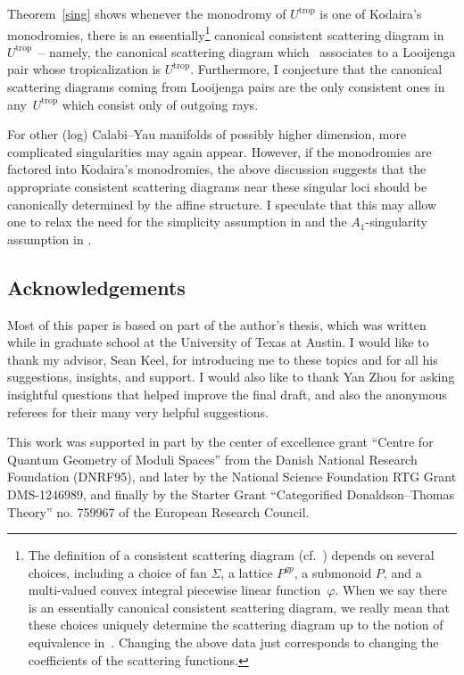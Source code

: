 \documentclass[pdftex]{sigma}
\numberwithin{equation}{section}
\numberwithin{figure}{section}
\numberwithin{table}{section}
\DeclareMathOperator{\trop}{trop}
\theoremstyle{definition}
\begin{document}
Theorem~\ref{sing} shows whenever the monodromy of $U^{\trop}$ is one of Kodaira's monodromies, there is an essentially\footnote{The definition of a consistent scattering diagram (cf.~\cite{GHK1}) depends on several choices, including a choice of fan $\Sigma$, a lattice $P^{gp}$, a submonoid $P$, and a multi-valued convex integral piecewise linear function~$\varphi$. When we say there is an essentially canonical consistent scattering diagram, we really mean that these choices uniquely determine the scattering diagram up to the notion of equivalence in~\cite{GPS}. Changing the above data just corresponds to changing the coefficients of the scattering functions.} canonical consistent scattering diagram in $U^{\trop}$~-- namely, the cano\-ni\-cal scattering diagram which~\cite{GHK1} associates to a Looijenga pair whose tropicalization is $U^{\trop}$. Furthermore, I conjecture that the canonical scattering diagrams coming from Looijenga pairs are the only consistent ones in any~$U^{\trop}$ which consist only of outgoing rays.

For other (log) Calabi--Yau manifolds of possibly higher dimension, more complicated singularities may again appear. However, if the monodromies are factored into Kodaira's mono\-dromies, the above discussion suggests that the appropriate consistent scattering diagrams near these singular loci should be canonically determined by the affine structure. I speculate that this may allow one to relax the need for the simplicity assumption in \cite{GS11} and the $A_1$-singularity assumption in \cite{WCS}.

\subsection*{Acknowledgements}

Most of this paper is based on part of the author's thesis, which was written while in graduate school at the University of Texas at Austin. I would like to thank my advisor, Sean Keel, for introducing me to these topics and for all his suggestions, insights, and support. I would also like to thank Yan Zhou for asking insightful questions that helped improve the final draft, and also the anonymous referees for their many very helpful suggestions.

This work was supported in part by the center of excellence grant ``Centre for Quantum Geometry of Moduli Spaces'' from the Danish National Research Foundation (DNRF95), and later by the National Science Foundation RTG Grant DMS-1246989, and finally by the Starter Grant ``Categorified Donaldson--Thomas Theory'' no. 759967 of the European Research Council.
\end{document}
